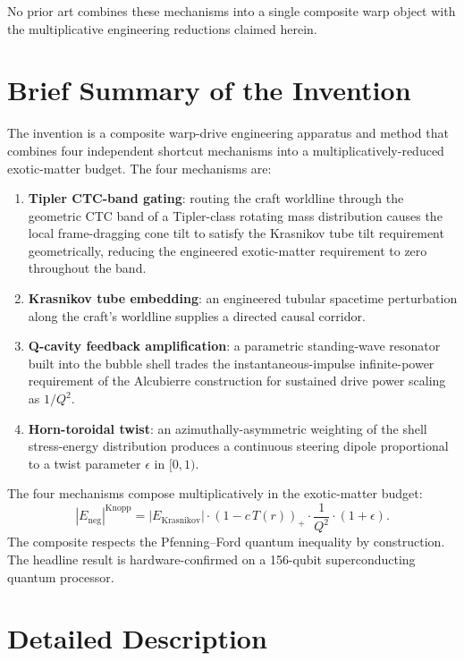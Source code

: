 \documentclass[11pt,a4paper]{article}
\begin{document}
No prior art combines these mechanisms into a single composite warp object with the multiplicative engineering reductions claimed herein.

\section{Brief Summary of the Invention}

The invention is a composite warp-drive engineering apparatus and method that combines four independent shortcut mechanisms into a multiplicatively-reduced exotic-matter budget. The four mechanisms are:

\begin{enumerate}[label=(\alph*),leftmargin=*]
\item \textbf{Tipler CTC-band gating}: routing the craft worldline through the geometric CTC band of a Tipler-class rotating mass distribution causes the local frame-dragging cone tilt to satisfy the Krasnikov tube tilt requirement geometrically, reducing the engineered exotic-matter requirement to zero throughout the band.

\item \textbf{Krasnikov tube embedding}: an engineered tubular spacetime perturbation along the craft's worldline supplies a directed causal corridor.

\item \textbf{Q-cavity feedback amplification}: a parametric standing-wave resonator built into the bubble shell trades the instantaneous-impulse infinite-power requirement of the Alcubierre construction for sustained drive power scaling as $1/Q^2$.

\item \textbf{Horn-toroidal twist}: an azimuthally-asymmetric weighting of the shell stress-energy distribution produces a continuous steering dipole proportional to a twist parameter $\epsilon$ in $[0, 1)$.
\end{enumerate}

The four mechanisms compose multiplicatively in the exotic-matter budget:
\begin{equation*}
|E_{\mathrm{neg}}|^{\mathrm{Knopp}} = |E_{\mathrm{Krasnikov}}|\cdot (1 - c\,T(r))_{+}\cdot \frac{1}{Q^{2}}\cdot (1+\epsilon).
\end{equation*}
The composite respects the Pfenning--Ford quantum inequality by construction. The headline result is hardware-confirmed on a 156-qubit superconducting quantum processor.

\section{Detailed Description}
\end{document}
